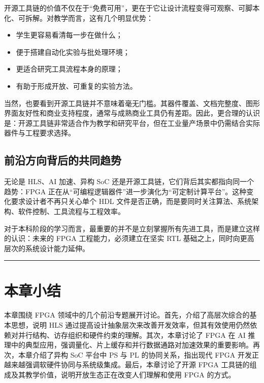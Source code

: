 开源工具链的价值不仅在于``免费可用''，更在于它让设计流程变得可观察、可脚本化、可拆解。对教学而言，这有几个明显优势：

\begin{itemize}
\tightlist
\item
  学生更容易看清每一步在做什么；
\item
  便于搭建自动化实验与批处理环境；
\item
  更适合研究工具流程本身的原理；
\item
  有助于形成开放、可重复的实验方法。
\end{itemize}

当然，也要看到开源工具链并不意味着毫无门槛。其器件覆盖、文档完整度、图形界面友好性和商业支持程度，通常与成熟商业工具仍有差距。因此，更合理的认识是：开源工具链非常适合作为教学和研究平台，但在工业量产场景中仍需结合实际器件与工程要求选择。

\subsection{前沿方向背后的共同趋势}\label{ux524dux6cbfux65b9ux5411ux80ccux540eux7684ux5171ux540cux8d8bux52bf}

无论是 HLS、AI 加速、异构 SoC
还是开源工具链，它们背后其实都指向同一个趋势：FPGA
正在从``可编程逻辑器件''进一步演化为``可定制计算平台''。这种变化要求设计者不再只关心单个
HDL
文件是否正确，而是要同时关注算法、系统架构、软件控制、工具流程与工程效率。

对于本科阶段的学习而言，最重要的并不是立刻掌握所有先进工具，而是建立这样的认识：未来的
FPGA 工程能力，必须建立在坚实 RTL
基础之上，同时向更高层次的系统设计能力延伸。

\begin{center}\rule{0.5\linewidth}{0.5pt}\end{center}

\section{本章小结}\label{ux672cux7ae0ux5c0fux7ed3}

本章围绕 FPGA
领域中的几个前沿专题展开讨论。首先，介绍了高层次综合的基本思想，说明 HLS
通过提高设计抽象层次来改善开发效率，但其有效使用仍然依赖对并行结构、访存组织和硬件约束的理解。其次，本章讨论了
FPGA 在 AI
推理中的典型应用，强调量化、片上缓存和并行数据通路对加速效果的重要影响。再次，本章介绍了异构
SoC 平台中 PS 与 PL 的协同关系，指出现代 FPGA
开发正越来越强调软硬件协同与系统级集成。最后，本章讨论了开源 FPGA
工具链的组成及其教学价值，说明开放生态正在改变人们理解和使用 FPGA
的方式。

